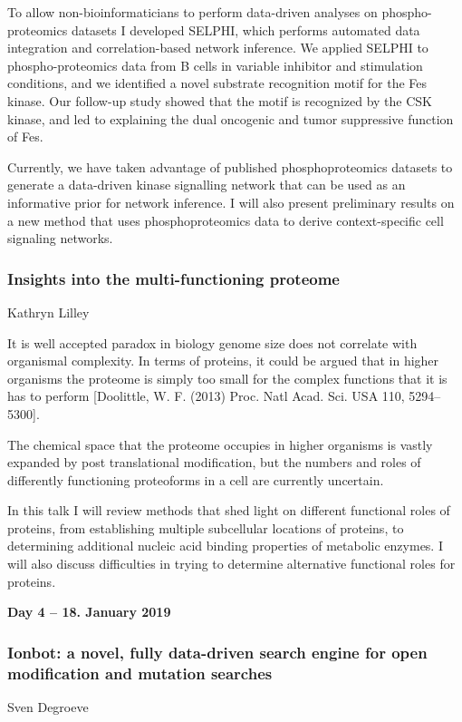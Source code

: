 To allow non-bioinformaticians to perform data-driven analyses on
phospho-proteomics datasets I developed SELPHI, which performs automated data
integration and correlation-based network inference. We applied SELPHI to
phospho-proteomics data from B cells in variable inhibitor and stimulation
conditions, and we identified a novel substrate recognition motif for the Fes
kinase. Our follow-up study showed that the motif is recognized by the CSK
kinase, and led to explaining the dual oncogenic and tumor suppressive function
of Fes.

Currently, we have taken advantage of published phosphoproteomics datasets to
generate a data-driven kinase signalling network that can be used as an
informative prior for network inference.  I will also present preliminary
results on a new method that uses phosphoproteomics data to derive
context-specific cell signaling networks.

\subsubsection*{\color{eubicRed} Insights into the multi-functioning proteome}
{\color{eubicGray}Kathryn Lilley}

It is well accepted paradox in biology genome size does not correlate with
organismal complexity. In terms of proteins, it could be argued that in higher
organisms the proteome is simply too small for the complex functions that it is
has to perform [Doolittle, W. F. (2013) Proc. Natl Acad. Sci. USA 110, 5294–5300].

The chemical space that the proteome occupies in higher organisms is vastly
expanded by post translational modification, but the numbers and roles of
differently functioning proteoforms in a cell are currently uncertain.

In this talk I will review methods that shed light on different functional
roles of proteins, from establishing multiple subcellular locations of
proteins, to determining additional nucleic acid binding properties of
metabolic enzymes. I will also discuss difficulties in trying to determine
alternative functional roles for proteins.


\vspace{1cm}
\noindent\textbf{Day 4 -- 18. January 2019}

\subsubsection*{\color{eubicRed} Ionbot: a novel, fully data-driven search engine for open modification and mutation searches}
{\color{eubicGray}Sven Degroeve}


